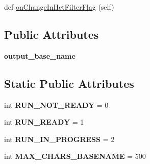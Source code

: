 \begin{DoxyCompactItemize}
\item 
def \hyperlink{classnegui_1_1pgguisimupop__experimental_1_1PGGuiSimuPop_a1bd444cda1ad42319d3b893e36c82a48}{on\+Change\+In\+Het\+Filter\+Flag} (self)
\end{DoxyCompactItemize}
\subsection*{Public Attributes}
\begin{DoxyCompactItemize}
\item 
{\bfseries output\+\_\+base\+\_\+name}\hypertarget{classnegui_1_1pgguisimupop__experimental_1_1PGGuiSimuPop_adfb7ba6ed1fd22ce052e5dec4143d9fa}{}\label{classnegui_1_1pgguisimupop__experimental_1_1PGGuiSimuPop_adfb7ba6ed1fd22ce052e5dec4143d9fa}

\end{DoxyCompactItemize}
\subsection*{Static Public Attributes}
\begin{DoxyCompactItemize}
\item 
int {\bfseries R\+U\+N\+\_\+\+N\+O\+T\+\_\+\+R\+E\+A\+DY} = 0\hypertarget{classnegui_1_1pgguisimupop__experimental_1_1PGGuiSimuPop_a74abeed18b1c82d272180efb4a0e3b8b}{}\label{classnegui_1_1pgguisimupop__experimental_1_1PGGuiSimuPop_a74abeed18b1c82d272180efb4a0e3b8b}

\item 
int {\bfseries R\+U\+N\+\_\+\+R\+E\+A\+DY} = 1\hypertarget{classnegui_1_1pgguisimupop__experimental_1_1PGGuiSimuPop_a3e4851bcd6d328342f63d83896fd86fd}{}\label{classnegui_1_1pgguisimupop__experimental_1_1PGGuiSimuPop_a3e4851bcd6d328342f63d83896fd86fd}

\item 
int {\bfseries R\+U\+N\+\_\+\+I\+N\+\_\+\+P\+R\+O\+G\+R\+E\+SS} = 2\hypertarget{classnegui_1_1pgguisimupop__experimental_1_1PGGuiSimuPop_a363ecab1e3700ceb08937f1ed1c4641e}{}\label{classnegui_1_1pgguisimupop__experimental_1_1PGGuiSimuPop_a363ecab1e3700ceb08937f1ed1c4641e}

\item 
int {\bfseries M\+A\+X\+\_\+\+C\+H\+A\+R\+S\+\_\+\+B\+A\+S\+E\+N\+A\+ME} = 500\hypertarget{classnegui_1_1pgguisimupop__experimental_1_1PGGuiSimuPop_a01063c04e2336d08f9d21be11a456397}{}\label{classnegui_1_1pgguisimupop__experimental_1_1PGGuiSimuPop_a01063c04e2336d08f9d21be11a456397}

\end{DoxyCompactItemize}


